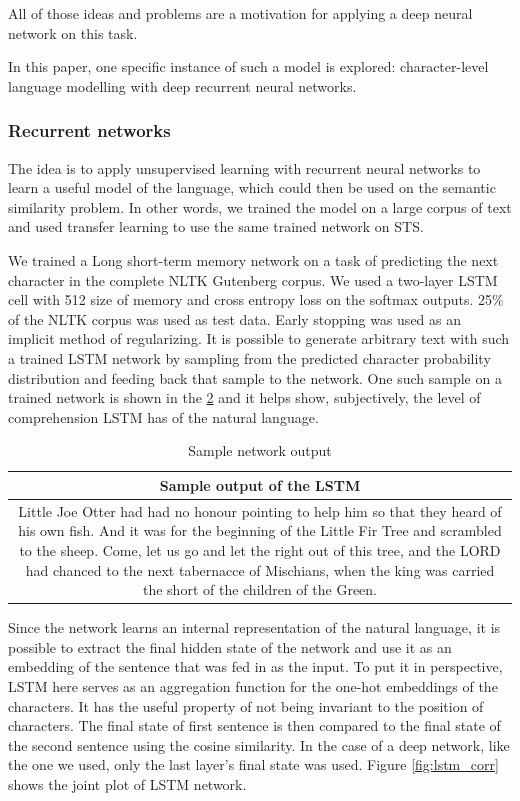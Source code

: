 \documentclass[10pt, a4paper]{article}
\begin{document}
\begin{table}[h!]
All of those ideas and problems are a motivation for applying a deep neural network on this task.

In this paper, one specific instance of such a model is explored: character-level language modelling with deep recurrent neural networks.

\subsubsection{Recurrent networks}

The idea is to apply unsupervised learning with recurrent neural networks to learn a useful model of the language, which could then be used on the semantic similarity problem.
In other words, we trained the model on a large corpus of text and used transfer learning to use the same trained network on STS.

We trained a Long short-term memory network \citep{LSTM} on a task of predicting the next character in the complete NLTK Gutenberg corpus. 
We used a two-layer LSTM cell with 512 size of memory and cross entropy loss on the softmax outputs.
25\% of the NLTK corpus was used as test data. Early stopping was used as an implicit method of regularizing.
It is possible to generate arbitrary text with such a trained LSTM network by sampling from the predicted character probability distribution and feeding back that sample to the network. 
One such sample on a trained network is shown in the \ref{tab:sample_output} and it helps show, subjectively, the level of comprehension LSTM has of the natural language.

\begin{table}
\caption{Sample network output}
\label{tab:sample_output}
\begin{center}
\begin{tabular}{c}
\toprule
Sample output of the LSTM \\
\midrule
\multicolumn{1}{m{6.5cm}}{Little Joe Otter had had no honour pointing to help him so that they
heard of his own fish.  And it was for the beginning of the Little Fir Tree and
scrambled to the sheep. 
Come, let us go and let the right out of this tree, and the LORD had chanced
to the next tabernacce of Mischians, when the king was carried the short of the children of the Green.}
\bottomrule
\end{tabular}
\end{center}
\end{table}

Since the network learns an internal representation of the natural language, it is possible to extract the final hidden state of the network and use it as an embedding of the sentence that was fed in as the input.
To put it in perspective, LSTM here serves as an aggregation function for the one-hot embeddings of the characters. 
It has the useful property of not being invariant to the position of characters.
The final state of first sentence is then compared to the final state of the second sentence using the cosine similarity. 
In the case of a deep network, like the one we used, only the last layer's final state was used.
Figure \ref{fig:lstm_corr} shows the joint plot of LSTM network.


\end{table}
\end{document}
